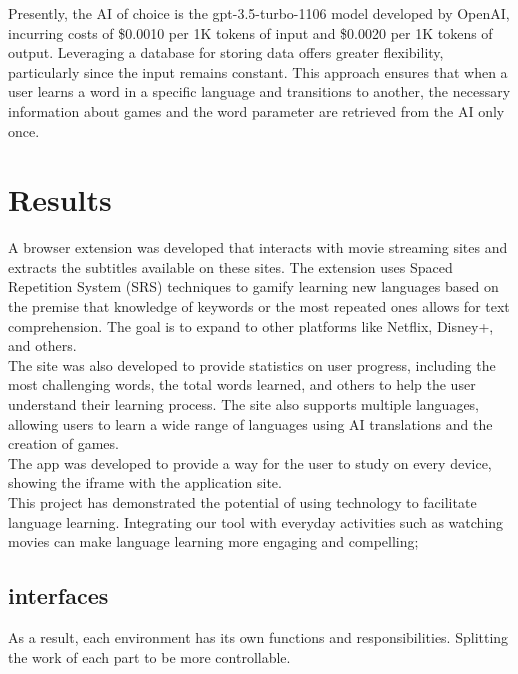 \documentclass[12pt]{article}
\begin{document}
Presently, the AI of choice is the gpt-3.5-turbo-1106 model developed by OpenAI, incurring costs of \$0.0010 per 1K tokens of input and \$0.0020 per 1K tokens of output. Leveraging a database for storing data offers greater flexibility, particularly since the input remains constant. This approach ensures that when a user learns a word in a specific language and transitions to another, the necessary information about games and the word parameter are retrieved from the AI only once. \\

\section{Results}
A browser extension was developed that interacts with movie streaming sites and extracts the subtitles available on these sites. The extension uses Spaced Repetition System (SRS) techniques to gamify learning new languages based on the premise that knowledge of keywords or the most repeated ones allows for text comprehension. The goal is to expand to other platforms like Netflix, Disney+, and others. \\ 
The site was also developed to provide statistics on user progress, including the most challenging words, the total words learned, and others to help the user understand their learning process. The site also supports multiple languages, allowing users to learn a wide range of languages using AI translations and the creation of games.  \\
The app was developed to provide a way for the user to study on every device, showing the iframe with the application site.\\
This project has demonstrated the potential of using technology to facilitate language learning. Integrating our tool with everyday activities such as watching movies can make language learning more engaging and compelling; \\
\subsection{interfaces}
As a result, each environment has its own functions and responsibilities. Splitting the work of each part to be more controllable. 
\end{document}
